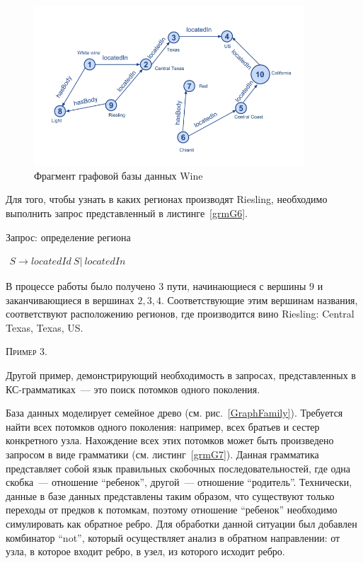 \begin{figure}
 \centering
 \includegraphics[width=0.9\textwidth]{Smolina/pics/GraphWine.png}
 \caption{Фрагмент графовой базы данных Wine}
 \label{GraphWine}
\end{figure}

Для того, чтобы узнать в каких регионах производят Riesling, необходимо выполнить запрос представленный в листинге~\ref{grmG6}. 

\begin{listing}
\caption{Запрос: определение региона}
\label{grmG6}
\centering
$\begin{array}{rl}
S \rightarrow locatedId \ S | \ locatedIn
\end{array}$
 \end{listing}

В процессе работы было получено 3 пути, начинающиеся с вершины $9$ и заканчивающиеся в вершинах $2, 3, 4$. Соответствующие этим вершинам названия, соответствуют расположению регионов, где производится вино Riesling: Central Texas, Texas, US.
 
 \textsc{Пример 3.}

Другой пример, демонстрирующий необходимость в запросах, представленных в КС-грамматиках~--- это поиск потомков одного поколения.

База данных моделирует семейное древо (см. рис.~\ref{GraphFamily}). Требуется найти всех потомков одного поколения: например, всех братьев и сестер конкретного узла. Нахождение всех этих потомков может быть произведено запросом в виде грамматики (см. листинг~\ref{grmG7}). Данная грамматика представляет собой язык правильных скобочных последовательностей, где одна скобка~--- отношение ``ребенок'', другой~--- отношение ``родитель''. Технически, данные в базе данных представлены таким образом, что существуют только переходы от предков к потомкам, поэтому отношение ``ребенок'' необходимо симулировать как обратное ребро. Для обработки данной ситуации был добавлен комбинатор ``not'', который осуществляет анализ в обратном направлении: от узла, в которое входит ребро, в узел, из которого исходит ребро.


